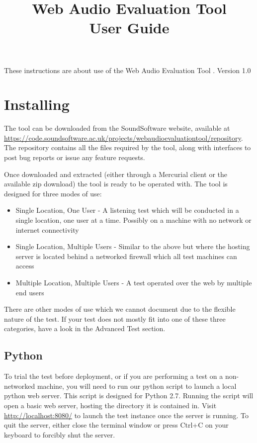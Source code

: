 \documentclass[11pt, oneside]{article}   	%
\title{Web Audio Evaluation Tool \\User Guide}
\date{}							%
\begin{document}
\maketitle

These instructions are about use of the Web Audio Evaluation Tool \cite{deman2015c}.
Version 1.0

\tableofcontents

\section{Installing}

The tool can be downloaded from the SoundSoftware website, available at \url{https://code.soundsoftware.ac.uk/projects/webaudioevaluationtool/repository}. The repository contains all the files required by the tool, along with interfaces to post bug reports or issue any feature requests.

Once downloaded and extracted (either through a Mercurial client or the available zip download) the tool is ready to be operated with. The tool is designed for three modes of use:
\begin{itemize}
\item Single Location, One User - A listening test which will be conducted in a single location, one user at a time. Possibly on a machine with no network or internet connectivity
\item Single Location, Multiple Users - Similar to the above but where the hosting server is located behind a networked firewall which all test machines can access
\item Multiple Location, Multiple Users - A test operated over the web by multiple end users
\end{itemize}
There are other modes of use which we cannot document due to the flexible nature of the test. If your test does not mostly fit into one of these three categories, have a look in the Advanced Test section.

\subsection{Python}

To trial the test before deployment, or if you are performing a test on a non-networked machine, you will need to run our python script to launch a local python web server. This script is designed for Python 2.7. Running the script will open a basic web server, hosting the directory it is contained in. Visit \url{http://localhost:8080/} to launch the test instance once the server is running. To quit the server, either close the terminal window or press Ctrl+C on your keyboard to forcibly shut the server.
\end{document}
